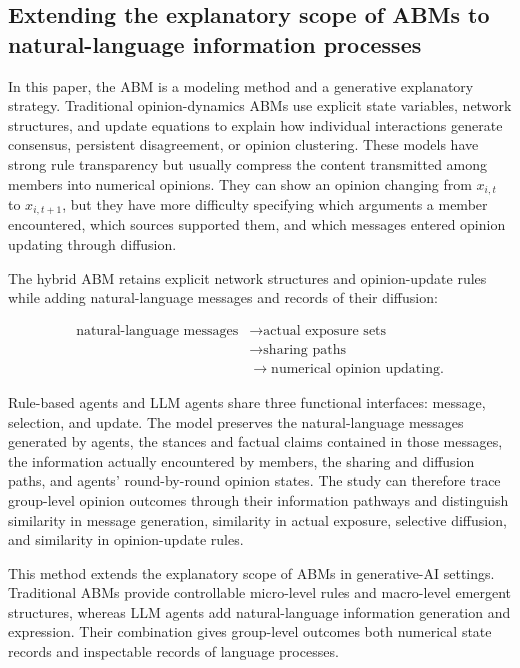 \documentclass[11pt,a4paper]{article}
\begin{document}
\subsection{Extending the explanatory scope of ABMs to natural-language information processes}

In this paper, the ABM is a modeling method and a generative explanatory strategy. Traditional opinion-dynamics ABMs use explicit state variables, network structures, and update equations to explain how individual interactions generate consensus, persistent disagreement, or opinion clustering. These models have strong rule transparency but usually compress the content transmitted among members into numerical opinions. They can show an opinion changing from $x_{i,t}$ to $x_{i,t+1}$, but they have more difficulty specifying which arguments a member encountered, which sources supported them, and which messages entered opinion updating through diffusion.

The hybrid ABM retains explicit network structures and opinion-update rules while adding natural-language messages and records of their diffusion:

\begin{equation*}
\begin{aligned}\text{natural-language messages} &\rightarrow \text{actual exposure sets} \\
&\rightarrow \text{sharing paths} \\
&\rightarrow \text{numerical opinion updating}.\end{aligned}
\end{equation*}

Rule-based agents and LLM agents share three functional interfaces: message, selection, and update. The model preserves the natural-language messages generated by agents, the stances and factual claims contained in those messages, the information actually encountered by members, the sharing and diffusion paths, and agents' round-by-round opinion states. The study can therefore trace group-level opinion outcomes through their information pathways and distinguish similarity in message generation, similarity in actual exposure, selective diffusion, and similarity in opinion-update rules.

This method extends the explanatory scope of ABMs in generative-AI settings. Traditional ABMs provide controllable micro-level rules and macro-level emergent structures, whereas LLM agents add natural-language information generation and expression. Their combination gives group-level outcomes both numerical state records and inspectable records of language processes.
\end{document}
